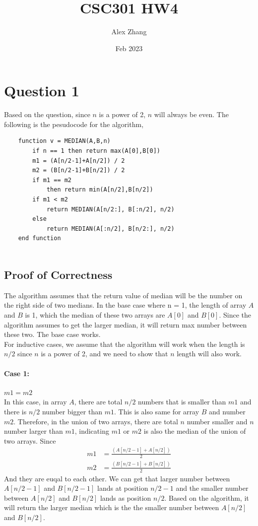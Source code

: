 \documentclass{article}
\title{CSC301 HW4}
\author{Alex Zhang}
\date{Feb 2023}
\begin{document}
\maketitle


\section*{Question 1}
Based on the question, since $n$ is a power of 2, $n$ will always be even. The following is the pesudocode for the algorithm,
\begin{verbatim}
    function v = MEDIAN(A,B,n)
        if n == 1 then return max(A[0],B[0])
        m1 = (A[n/2-1]+A[n/2]) / 2
        m2 = (B[n/2-1]+B[n/2]) / 2
        if m1 == m2 
            then return min(A[n/2],B[n/2])
        if m1 < m2
            return MEDIAN(A[n/2:], B[:n/2], n/2)
        else
            return MEDIAN(A[:n/2], B[n/2:], n/2)
    end function
        
\end{verbatim}
    \subsection*{Proof of Correctness}
    The algorithm assumes that the return value of median will be the number on the right side of two medians.
    In the base case where n = 1, the length of array $A$ and $B$ is 1, which the median of these two arrays are $A[0]$ and $B[0]$. Since the algorithm assumes to
    get the larger median, it will return max number between these two. The base case works.
    \\
    For inductive cases, we assume that the algorithm will work when the length is $n/2$ since $n$ is a power of 2, and we need to show that $n$ length will also work.
    \paragraph*{Case 1:} $m1 = m2$\\
    In this case, in array $A$, there are total $n/2$ numbers that is smaller than $m1$ and there is $n/2$ number bigger than $m1$. This is also same for array $B$ and
    number $m2$. Therefore, in the union of two arrays, there are total $n$ number smaller and $n$ number larger than $m1$, indicating $m1$ or $m2$ is also the median
    of the union of two arrays. Since
    \begin{align}
        m1 &= \frac{(A[n/2-1]+A[n/2])}{2} \nonumber \\
        m2 &= \frac{(B[n/2-1]+B[n/2])}{2} \nonumber        
    \end{align}
    And they are euqal to each other. We can get that larger number between $A[n/2-1]$ and $B[n/2-1]$
    lands at position $n/2 -1$ and the smaller number between $A[n/2]$ and $B[n/2]$ lands as position $n/2$. Based on the algorithm, it will return the larger median which 
    is the the smaller number between $A[n/2]$ and $B[n/2]$.
    
\end{document}
